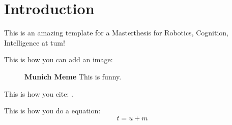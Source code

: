 \chapter{Introduction}%

This is an amazing template for a Masterthesis for Robotics, Cognition, Intelligence at \acrfull{tum}!

This is how you can add an image:
\begin{figure}[h!]%
    \centering%
    \caption{\textbf{Munich Meme} This is funny.}%
    \label{fig:lane-marking}%
\end{figure}%

This is how you cite: \cite{tumPaper}.

This is how you do a equation:
\begin{equation}
t = u + m
\end{equation}

\blindtext